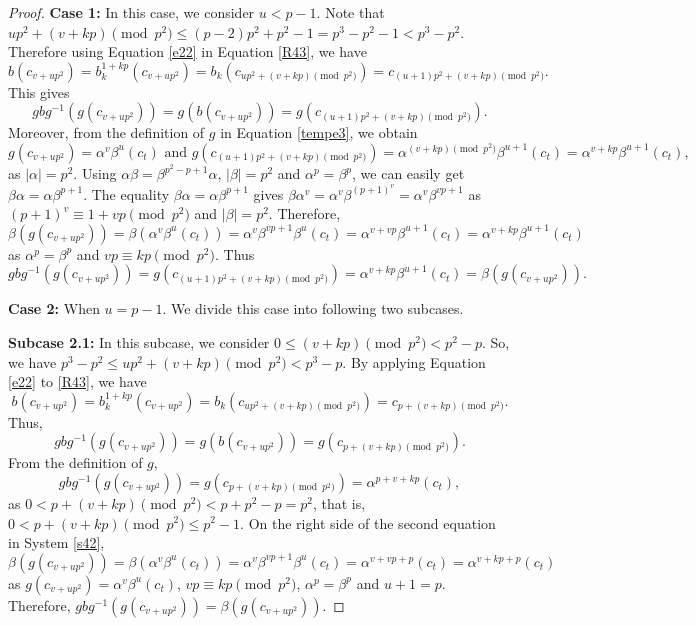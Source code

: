 \documentclass[11pt]{amsart}
\theoremstyle{plain}
\numberwithin{equation}{section}
\begin{document}
\begin{proof}
 \textbf{Case 1:} In this case, we consider $u<p-1$. Note that $up^2+(v+kp)\pmod {p^2} \leq (p-2)p^2+p^2-1=p^3-p^2-1<p^3-p^2.$ Therefore using Equation \eqref{e22} in Equation \eqref{R43}, we have 
 \[
 b(c_{v+up^2})=b_k^{1+kp}(c_{v+up^2})=b_{k}(c_{up^2+(v+kp)\pmod {p^2}})=c_{(u+1)p^2+(v+kp)\pmod {p^2}}.
 \]
 This gives 
  \[
  gbg^{-1}(g(c_{v+up^2})) = g(b(c_{v+up^2}))=g(c_{(u+1)p^2+(v+kp)\pmod {p^2}}).
 \]
Moreover, from the definition of $g$ in Equation \eqref{tempe3}, we obtain
\[
g(c_{v+up^2})=\alpha^{v}\beta^{u}(c_t) \text{ and } g(c_{(u+1)p^2+(v+kp)\pmod {p^2}})=\alpha^{(v+kp)\pmod {p^2}}\beta^{u+1}(c_t)=\alpha^{v+kp}\beta^{u+1}(c_t), 
\]
as $|\alpha|=p^2$.
Using $\alpha \beta=\beta^{p^2-p+1}\alpha$, $|\beta|=p^2$ and $\alpha^p=\beta^p$, we can easily get $\beta \alpha=\alpha \beta^{p+1}$. The equality $\beta \alpha=\alpha \beta^{p+1}$ gives $\beta \alpha^v=\alpha^v\beta^{(p+1)^v}=\alpha^v\beta^{vp+1}$ as $(p+1)^v \equiv 1+vp \pmod {p^2}$ and $|\beta|=p^2$. Therefore,
\begin{equation*}
\beta(g(c_{v+up^2}))=\beta(\alpha^{v}\beta^{u}(c_t)) = \alpha^v \beta^{vp+1}\beta^{u}(c_t)=\alpha^{v+vp}\beta^{u+1}(c_t)=\alpha^{v+kp}\beta^{u+1}(c_t)
\end{equation*}
as $\alpha^p=\beta^p$ and $vp \equiv kp \pmod {p^2}$. Thus
 \[ gbg^{-1}(g(c_{v+up^2}))=g(c_{(u+1)p^2+(v+kp)\pmod {p^2}})=\alpha^{v+kp}\beta^{u+1}(c_t)=\beta(g(c_{v+up^2})).\]

\textbf{Case 2:} When $u=p-1$. We divide this case into following two subcases.

\textbf{Subcase 2.1:} In this subcase, we consider $0 \leq (v+kp)\pmod {p^2}<p^2-p$. So, we have $p^3-p^2 \leq up^2+(v+kp)\pmod {p^2} <p^3-p$. By applying Equation \eqref{e22} to \eqref{R43}, we have 
\[
b(c_{v+up^2})=b_k^{1+kp}(c_{v+up^2})=b_k(c_{up^2+(v+kp)\pmod {p^2}})=c_{p+(v+kp)\pmod {p^2}}.
\]
Thus, 
  \[
  gbg^{-1}(g(c_{v+up^2}))= g(b(c_{v+up^2}))=g(c_{p+(v+kp)\pmod {p^2}}).
 \]
From the definition of $g$,
\[
gbg^{-1}(g(c_{v+up^2}))=g(c_{p+(v+kp)\pmod {p^2}})=\alpha^{p+v+kp}(c_t), 
\]
as $0<p+(v+kp)\pmod {p^2}<p+p^2-p= p^2$, that is, $0<p+(v+kp)\pmod {p^2} \leq p^2-1$.
On the right side of the second equation in System \eqref{s42},
\[
\beta(g(c_{v+up^2}))=\beta(\alpha^{v}\beta^{u}(c_t))= \alpha^v \beta^{vp+1} \beta^{u}(c_t)=\alpha^{v+vp+p}(c_t)=\alpha^{v+kp+p}(c_t)
\]
as $g(c_{v+up^2})=\alpha^{v}\beta^{u}(c_t)$, $vp \equiv kp \pmod {p^2}$, $\alpha^p=\beta^p$ and $u+1=p$. Therefore, $gbg^{-1}(g(c_{v+up^2}))=\beta(g(c_{v+up^2}))$.


\end{proof}
\end{document}
